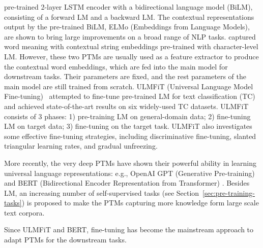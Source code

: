 \documentclass[fleqn]{SCYE-arxiv}
\begin{document}
\begin{multicols}{2}
\citet{peters2018elmo} pre-trained 2-layer LSTM encoder with a bidirectional language model (BiLM), consisting of a forward LM and a backward LM.
The contextual representations output by the pre-trained BiLM, ELMo (Embeddings from Language Models), are shown to bring large improvements on a broad range of NLP tasks.
\citet{akbik2018contextual} captured word meaning with contextual string embeddings pre-trained with character-level LM.
However, these two PTMs are usually used as a feature extractor to produce the contextual word embeddings, which are fed into the main model for downstream tasks. Their parameters are fixed, and the rest parameters of the main model are still trained from scratch.
ULMFiT (Universal Language Model Fine-tuning)~\cite{DBLP:conf/acl/RuderH18} attempted to fine-tune pre-trained LM for text classification (TC) and achieved state-of-the-art results on six widely-used TC datasets. ULMFiT consists of 3 phases: 1) pre-training LM on general-domain data; 2) fine-tuning LM on target data; 3) fine-tuning on the target task.
ULMFiT also investigates some effective fine-tuning strategies, including discriminative fine-tuning, slanted triangular learning rates, and gradual unfreezing.

More recently, the very deep PTMs have shown their powerful ability in learning universal language representations: e.g., OpenAI GPT (Generative Pre-training) \cite{radford2018improving} and BERT (Bidirectional Encoder Representation from Transformer) \cite{devlin2019bert}. Besides LM, an increasing number of self-supervised tasks (see Section~\ref{sec:pre-training-tasks}) is proposed to make the PTMs capturing more knowledge form large scale text corpora.

Since ULMFiT and BERT, fine-tuning has become the mainstream approach to adapt PTMs for the downstream tasks.



\end{multicols}
\end{document}
